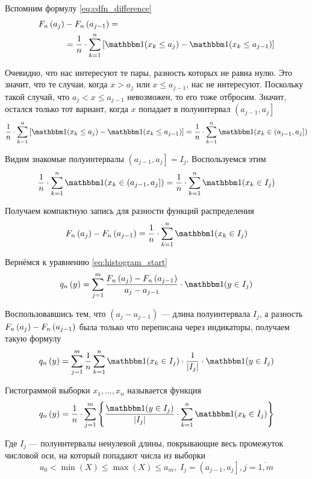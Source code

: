 Вспомним формулу \eqref{eq:cdfn_difference}
\begin{align*}
    \cdfn{a_j}&-\cdfn{a_{j-1}}=\\
    &=\frac{1}{n}\cdot \sum_{k=1}^n
    \left[\indicator{x_k\le a_j}-\indicator{x_k\le a_{j-1}}\right]
\end{align*}

Очевидно, что нас интересуют те пары, разность которых не равна нулю.
Это значит, что те случаи, когда $x>a_j$ или $x\le a_{j-1}$, нас не интересуют.
Поскольку такой случай, что $a_j<x\le a_{j-1}$ невозможен, то его тоже отбросим.
Значит, остался только тот вариант,
когда $x$ попадает в полуинтервал $\left(a_{j-1},a_j\right]$
$$\frac{1}{n}\cdot \sum_{k=1}^n
        \left[\indicator{x_k\le a_j}-\indicator{x_k\le a_{j-1}}\right]
    =\frac{1}{n}\cdot \sum_{k=1}^n \indicator{x_k\in \left(a_{j-1},a_j\right]}
$$

Видим знакомые полуинтервалы $\left(a_{j-1},a_j\right]=I_j$. Воспользуемся этим
$$\frac{1}{n}\cdot \sum_{k=1}^n \indicator{x_k\in \left(a_{j-1},a_j\right]}
=\frac{1}{n}\cdot \sum_{k=1}^n \indicator{x_k\in I_j}$$

Получаем компактную запись для разности функций распределения
\begin{equation}\label{eq:cdfn_difference_final}
\cdfn{a_j}-\cdfn{a_{j-1}}
=\frac{1}{n}\cdot \sum_{k=1}^n \indicator{x_k\in I_j}
\end{equation}


Вернёмся к уравнению \eqref{eq:histogram_start}
$$
q_n\left(y\right)
=\sum_{j=1}^m \frac{\cdfn{a_j}-\cdfn{a_{j-1}}}{a_j-a_{j-1}}
    \cdot\indicator{y\in I_j}
    $$

Воспользовавшись тем,
что $\left(a_j-a_{j-1}\right)$ --- длина полуинтервала $I_j$,
а разность $F_n\left(a_j\right)-F_n\left(a_{j-1}\right)$ была только что переписана
через индикаторы, получаем такую формулу
\begin{equation}\label{eq:histogramPreFinal}
    q_n\left(y\right)
        =\sum_{j=1}^m\frac{1}{n}\sum_{k=1}^n
            \indicator{x_k\in I_j}\cdot\frac{1}{\left|I_j\right|}
            \cdot \indicator{y \in I_j}
\end{equation}

\begin{definition}[Гистограмма]
    Гистограммой выборки $x_1, \dots, x_n$ называется функция
    $$q_n\left( y \right)
    = \frac{1}{n} \cdot \sum_{j=1}^{m} \left\{
        \frac{\indicator{y \in I_j}}{\left| I_j \right|}
        \cdot \sum_{k=1}^{n} \indicator{x_k\in I_j} \right\}$$

    Где $I_j$ --- полуинтервалы ненулевой длины, покрывающие весь промежуток
    числовой оси, на который попадают числа из выборки
    $$a_0 < \min\left( X \right) \le \max\left( X \right) \le a_m,\;
        I_j = \left( a_{j-1}, a_j \right], j = \overline{1, m}$$
\end{definition}

